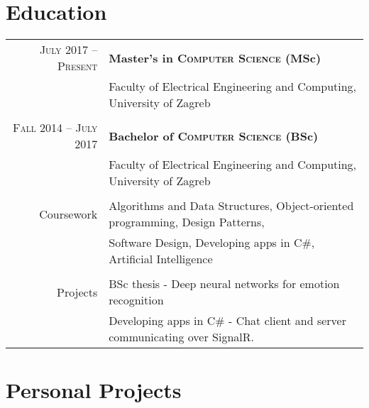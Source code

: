 \documentclass[a4paper,10pt]{article} %
\begin{document}
\vspace{5mm}


\section{Education}

\begin{tabular}{rl}
    \textsc{July 2017 -- Present} & \textbf{Master's in \textsc{Computer Science} (MSc)} \\
                                    & \footnotesize{Faculty of Electrical Engineering and Computing, University of Zagreb} \\
                                    \\

    \textsc{Fall 2014 -- July 2017} & \textbf{Bachelor of \textsc{Computer Science} (BSc)} \\
                                    & \footnotesize{Faculty of Electrical Engineering and Computing, University of Zagreb} \\
                                    \\

    Coursework & \footnotesize{Algorithms and Data Structures, Object-oriented programming, Design Patterns,} \\
               & \footnotesize{Software Design, Developing apps in C\#, Artificial Intelligence} \\
               \\

    Projects & BSc thesis - \footnotesize{Deep neural networks for emotion recognition} \\
             & Developing apps in C\# - \footnotesize{Chat client and server communicating over SignalR.} \\

\end{tabular}

\vspace{5mm}


\section{Personal Projects}
\end{document}
